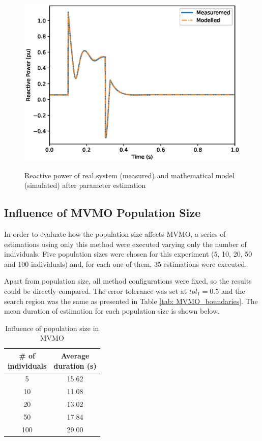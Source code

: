 \begin{figure}[h]
	\centering
	\caption{Reactive power of real system (measured) and mathematical model (simulated) after parameter estimation}
	\includegraphics[scale=0.7]{Images/Q_compared.eps}
	\label{fig: output_Q}
\end{figure}

\subsection{Influence of MVMO Population Size}

In order to evaluate how the population size affects MVMO, a series of estimations using only this method were executed varying only the number of individuals. Five population sizes were chosen for this experiment (5, 10, 20, 50 and 100 individuals) and, for each one of them, 35 estimations were executed.

Apart from population size, all method configurations were fixed, so the results could be directly compared. The error tolerance was set at $tol_{1} = 0.5$ and the search region was the same as presented in Table \ref{tab: MVMO_boundaries}. The mean duration of estimation for each population size is shown below.

\begin{table}[h]
	\centering
	\caption{Influence of population size in MVMO}
	\begin{tabular}{c|c}
		\shortstack{\# of \\ individuals} & \shortstack{Average \\ duration (s)} \\\hline
		5 & 15.62 \\
		10 & 11.08 \\
		20 & 13.02 \\
		50 & 17.84 \\
		100 & 29.00 
	\end{tabular}
	\label{tab: pop_size}
\end{table}

